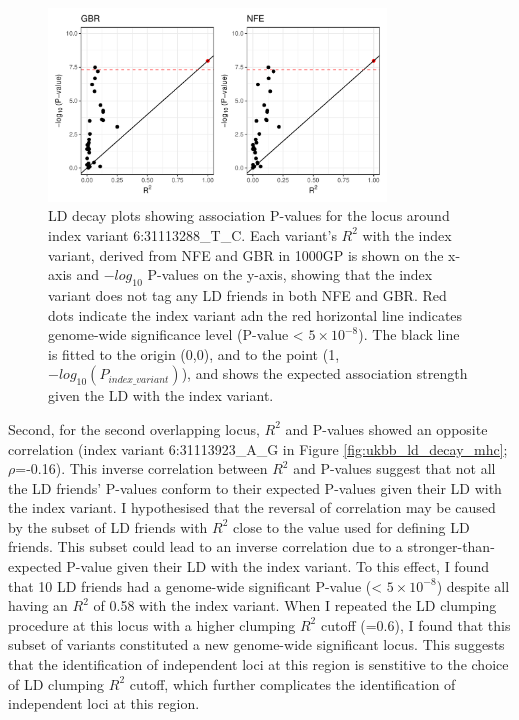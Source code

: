   \begin{figure}[H] 
    \centering    
    \includegraphics[width=0.8\textwidth]{ukbb_ld_decay_nfe_vs_gbr}
    \caption[Figure]{LD decay plots showing association P-values for the locus around index variant 6:31113288\_T\_C. Each variant's $R^{2}$ with the index variant, derived from NFE and GBR in 1000GP is shown on the x-axis and $-log_{10}$ P-values on the y-axis, showing that the index variant does not tag any LD friends in both NFE and GBR. Red dots indicate the index variant adn the red horizontal line indicates genome-wide significance level (P-value < $5\times10^{-8}$). The black line is fitted to the origin (0,0), and to the point (1,$-log_{10}(P_{index\_variant})$), and shows the expected association strength given the LD with the index variant.}
    \label{fig:ukbb_ld_decay_nfe_vs_gbr}
    \end{figure}

  Second, for the second overlapping locus, $R^{2}$ and P-values showed an opposite correlation (index variant 6:31113923\_A\_G in Figure \ref{fig:ukbb_ld_decay_mhc}; $\rho$=-0.16).  This inverse correlation between $R^{2}$ and P-values suggest that not all the LD friends' P-values conform to their expected P-values given their LD with the index variant. I hypothesised that the reversal of correlation may be caused by the subset of LD friends with $R^{2}$ close to the value used for defining LD friends. This subset could lead to an inverse correlation due to a stronger-than-expected P-value given their LD with the index variant. To this effect, I found that 10 LD friends had a genome-wide significant P-value (< $5\times10^{-8}$) despite all having an $R^{2}$ of 0.58 with the index variant. When I repeated the LD clumping procedure at this locus with a higher clumping $R^{2}$ cutoff (=0.6), I found that this subset of variants constituted a new genome-wide significant locus. This suggests that the identification of independent loci at this region is senstitive to the choice of LD clumping $R^{2}$ cutoff, which further complicates the identification of independent loci at this region. 
  

